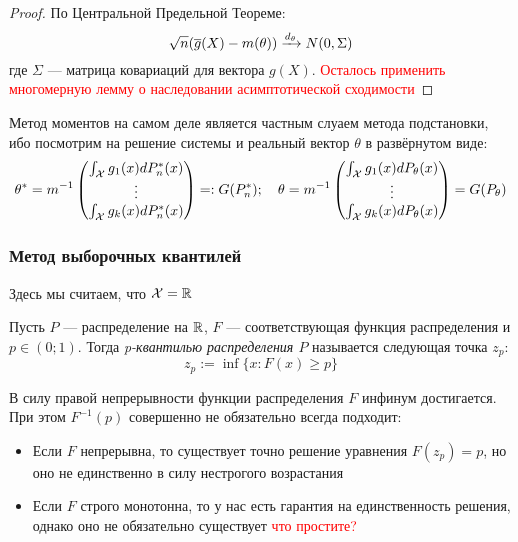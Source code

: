 \begin{proof}
	По Центральной Предельной Теореме:
	\[
		\sqrt{n}(\overline{g}(X) - m(\theta)) \xrightarrow{d_\theta} N(0, \Sigma)
	\]
	где $\Sigma$ --- матрица ковариаций для вектора $g(X)$. \textcolor{red}{Осталось применить многомерную лемму о наследовании асимптотической сходимости}
\end{proof}

\begin{note}
	Метод моментов на самом деле является частным слуаем метода подстановки, ибо посмотрим на решение системы и реальный вектор $\theta$ в развёрнутом виде:
	\[
		\theta^* = m^{-1} \begin{pmatrix}
			\int_{\mathcal{X}} g_1(x)dP_n^*(x)
			\\
			\vdots
			\\
			\int_{\mathcal{X}} g_k(x)dP_n^*(x)
		\end{pmatrix}
		=: G(P_n^*); \quad \theta = m^{-1} \begin{pmatrix}
			\int_{\mathcal{X}} g_1(x)dP_\theta(x)
			\\
			\vdots
			\\
			\int_{\mathcal{X}} g_k(x)dP_\theta(x)
		\end{pmatrix}
		= G(P_\theta)
	\]
\end{note}

\subsubsection*{Метод выборочных квантилей}

\begin{note}
	Здесь мы считаем, что $\mathcal{X} = \mathbb{R}$
\end{note}

\begin{definition}
	Пусть $P$ --- распределение на $\mathbb{R}$, $F$ --- соответствующая функция распределения и $p \in (0; 1)$. Тогда \textit{p-квантилью распределения $P$} называется следующая точка $z_p$:
	\[
		z_p := \inf \{x \colon F(x) \ge p\}
	\]
\end{definition}

\begin{note}
	В силу правой непрерывности функции распределения $F$ инфинум достигается. При этом $F^{-1}(p)$ совершенно не обязательно всегда подходит:
	\begin{itemize}
		\item Если $F$ непрерывна, то существует точно решение уравнения $F(z_p) = p$, но оно не единственно в силу нестрогого возрастания
		
		\item Если $F$ строго монотонна, то у нас есть гарантия на единственность решения, однако оно не обязательно существует \textcolor{red}{что простите?}
	\end{itemize}
\end{note}


